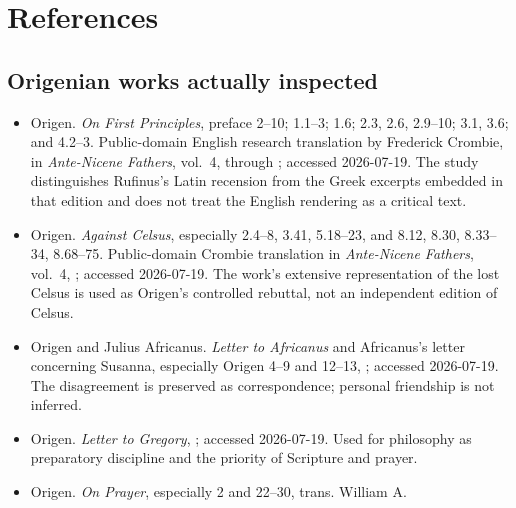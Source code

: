 \section{References}
\label{sec:origen-references}

\begingroup
\setlength{\parskip}{0.15em}
\titlespacing*{\subsection}{0pt}{1.35ex}{0.45ex}

\subsection{Origenian works actually inspected}

\begin{itemize}
\item Origen. \emph{On First Principles}, preface 2--10; 1.1--3; 1.6;
2.3, 2.6, 2.9--10; 3.1, 3.6; and 4.2--3. Public-domain English research
translation by Frederick Crombie, in \emph{Ante-Nicene Fathers}, vol.~4,
through ; accessed 2026-07-19. The study distinguishes Rufinus's Latin
recension from the Greek excerpts embedded in that edition and does not treat
the English rendering as a critical text.
\item Origen. \emph{Against Celsus}, especially 2.4--8, 3.41, 5.18--23, and
8.12, 8.30, 8.33--34, 8.68--75. Public-domain Crombie translation in
\emph{Ante-Nicene Fathers}, vol.~4,
;
accessed 2026-07-19. The work's extensive representation of the lost Celsus is
used as Origen's controlled rebuttal, not an independent edition of Celsus.
\item Origen and Julius Africanus. \emph{Letter to Africanus} and Africanus's
letter concerning Susanna, especially Origen 4--9 and 12--13,
; accessed 2026-07-19. The disagreement is preserved as
correspondence; personal friendship is not inferred.
\item Origen. \emph{Letter to Gregory},
; accessed 2026-07-19. Used for philosophy as preparatory
discipline and the priority of Scripture and prayer.
\item Origen. \emph{On Prayer}, especially 2 and 22--30, trans. William A.

\end{itemize}
